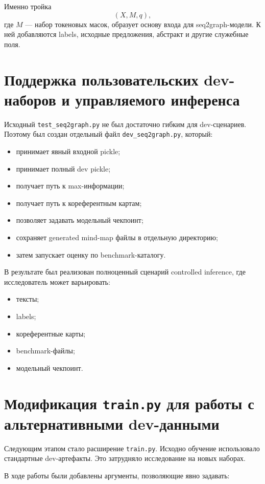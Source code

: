 \documentclass[12pt,a4paper]{article}
\begin{document}
Именно тройка
\[
(X, M, q),
\]
где $M$ --- набор токеновых масок, образует основу входа для seq2graph-модели. К ней
добавляются labels, исходные предложения, абстракт и другие служебные поля.

\section{Поддержка пользовательских dev-наборов и управляемого инференса}

Исходный \texttt{test\_seq2graph.py} не был достаточно гибким для dev-сценариев. Поэтому
был создан отдельный файл \texttt{dev\_seq2graph.py}, который:

\begin{itemize}
    \item принимает явный входной pickle;
    \item принимает полный dev pickle;
    \item получает путь к max-информации;
    \item получает путь к кореферентным картам;
    \item позволяет задавать модельный чекпоинт;
    \item сохраняет generated mind-map файлы в отдельную директорию;
    \item затем запускает оценку по benchmark-каталогу.
\end{itemize}

В результате был реализован полноценный сценарий controlled inference, где исследователь
может варьировать:

\begin{itemize}
    \item тексты;
    \item labels;
    \item кореферентные карты;
    \item benchmark-файлы;
    \item модельный чекпоинт.
\end{itemize}

\section{Модификация \texttt{train.py} для работы с альтернативными dev-данными}

Следующим этапом стало расширение \texttt{train.py}. Исходно обучение использовало
стандартные dev-артефакты. Это затрудняло исследование на новых наборах.

В ходе работы были добавлены аргументы, позволяющие явно задавать:
\end{document}
